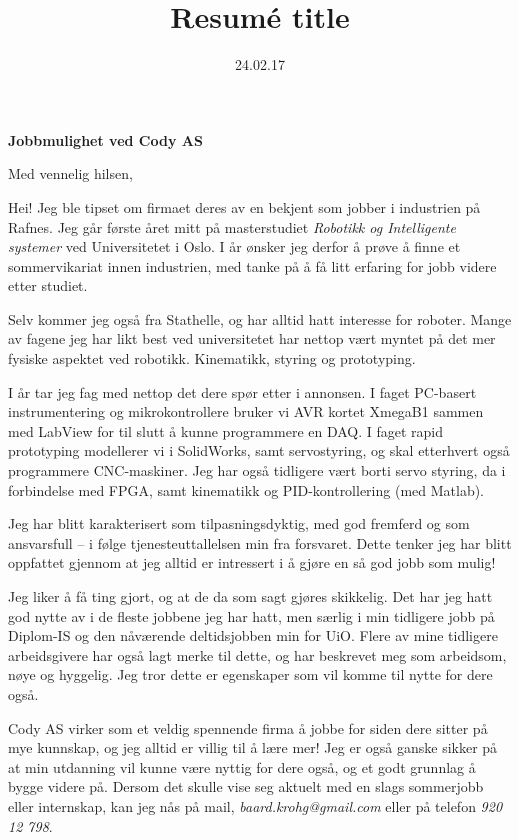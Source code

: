 \documentclass[11pt,a4paper,sans]{moderncv}        %
\title{Resumé title}                               %
\begin{document}

\date{24.02.17}
\opening{\large\textbf{Jobbmulighet ved Cody AS}}
\closing{Med vennelig hilsen,}

\makelettertitle

Hei! Jeg ble tipset om firmaet deres av en bekjent som jobber i industrien på Rafnes. Jeg går første året mitt på masterstudiet \emph{Robotikk og Intelligente systemer} ved Universitetet i Oslo. I år ønsker jeg derfor å prøve å finne et sommervikariat innen industrien, med tanke på å få litt erfaring for jobb videre etter studiet.

Selv kommer jeg også fra Stathelle, og har alltid hatt interesse for roboter. Mange av fagene jeg har likt best ved universitetet har nettop vært myntet på det mer fysiske aspektet ved robotikk. Kinematikk, styring og prototyping.

I år tar jeg fag med nettop det dere spør etter i annonsen. I faget PC-basert instrumentering og mikrokontrollere bruker vi AVR kortet XmegaB1 sammen med LabView for til slutt å kunne programmere en DAQ. I faget rapid prototyping modellerer vi i SolidWorks, samt servostyring, og skal etterhvert også programmere CNC-maskiner.
Jeg har også tidligere vært borti servo styring, da i forbindelse med FPGA, samt kinematikk og PID-kontrollering (med Matlab).

Jeg har blitt karakterisert som tilpasningsdyktig, med god fremferd og som ansvarsfull -- i følge tjenesteuttallelsen min fra forsvaret. Dette tenker jeg har blitt oppfattet gjennom at jeg alltid er intressert i å gjøre en så god jobb som mulig!

Jeg liker å få ting gjort, og at de da som sagt gjøres skikkelig. Det har jeg hatt god nytte av i de fleste jobbene jeg har hatt, men særlig i min tidligere jobb på Diplom-IS og den nåværende deltidsjobben min for UiO. Flere av mine tidligere arbeidsgivere har også lagt merke til dette, og har beskrevet meg som arbeidsom, nøye og hyggelig.
Jeg tror dette er egenskaper som vil komme til nytte for dere også.

Cody AS virker som et veldig spennende firma å jobbe for siden dere sitter på mye kunnskap, og jeg alltid er villig til å lære mer! Jeg er også ganske sikker på at min utdanning vil kunne være nyttig for dere også, og et godt grunnlag å bygge videre på. Dersom det skulle vise seg aktuelt med en slags sommerjobb eller internskap, kan jeg nås på mail, \emph{baard.krohg@gmail.com} eller på telefon \emph{920 12 798}.

\makeletterclosing
\end{document}
